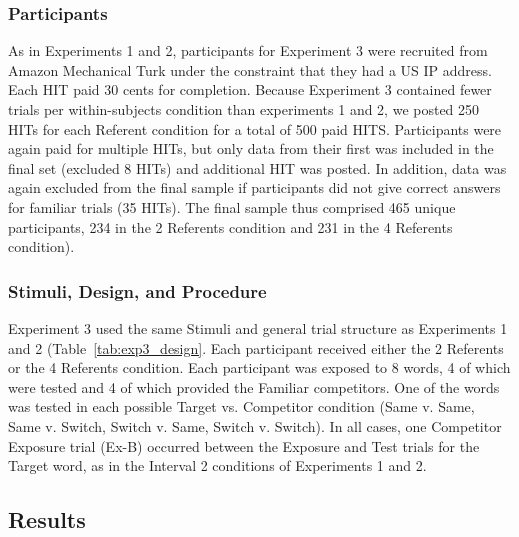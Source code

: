\documentclass[man,floatsintext]{apa6}
\begin{document}
\subsubsection{Participants}

As in Experiments 1 and 2, participants for Experiment 3 were recruited from Amazon Mechanical Turk under the constraint that they had a US IP address. Each HIT paid 30 cents for completion. Because Experiment 3 contained fewer trials per within-subjects condition than experiments 1 and 2, we posted 250 HITs for each Referent condition for a total of 500 paid HITS. Participants were again paid for multiple HITs, but only data from their first was included in the final set (excluded 8 HITs) and additional HIT was posted. In addition, data was again excluded from the final sample if participants did not give correct answers for familiar trials (35 HITs). The final sample thus comprised 465 unique participants, 234 in the 2 Referents condition and 231 in the 4 Referents condition).

\subsubsection{Stimuli, Design, and Procedure}

Experiment 3 used the same Stimuli and general trial structure as Experiments 1 and 2 (Table~\ref{tab:exp3_design}. Each participant received either the 2 Referents or the 4 Referents condition. Each participant was exposed to 8 words, 4 of which were tested and 4 of which provided the Familiar competitors. One of the words was tested in each possible Target vs. Competitor condition (Same v. Same, Same v. Switch, Switch v. Same, Switch v. Switch). In all cases, one Competitor Exposure trial (Ex-B) occurred between the Exposure and Test trials for the Target word, as in the Interval 2 conditions of Experiments 1 and 2. 

\subsection{Results}
\end{document}
